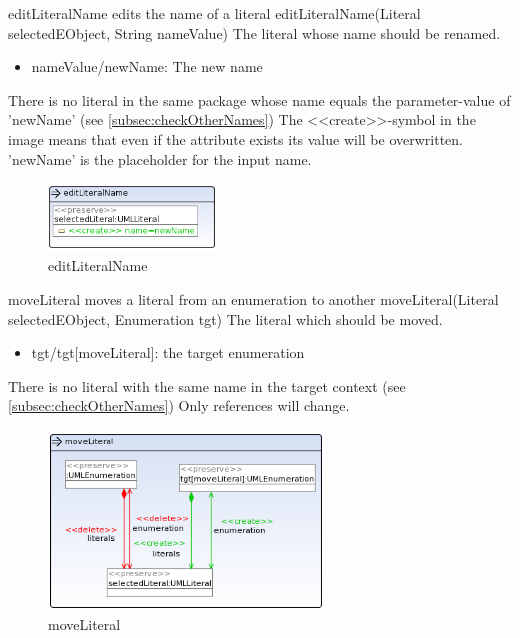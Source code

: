 \op
{editLiteralName}
{edits the name of a literal}
{editLiteralName(Literal selectedEObject, String nameValue)}
{The literal whose name should be renamed.}
{
\begin{itemize}
 \item nameValue/newName: The new name
\end{itemize}
}
{There is no literal in the same package whose name equals the parameter-value of
'newName' (see
\ref{subsec:checkOtherNames})}
{The \textless\textless create\textgreater\textgreater  -symbol in the image
means that even if the attribute exists its value will be overwritten.
'newName' is the placeholder for the input name.}
\begin{figure}[H]
  \centering
  \includegraphics[width=0.4\textwidth]{pics/editLiteralName.png}
  \caption{editLiteralName}
  \label{editLiteralName}
\end{figure}
\op
{moveLiteral}
{moves a literal from an enumeration to another}
{moveLiteral(Literal selectedEObject, Enumeration tgt)}
{The literal which should be moved.}
{
\begin{itemize}
 \item tgt/tgt[moveLiteral]: the target enumeration
\end{itemize}
}
{There is no literal with the same name in the target context (see
\ref{subsec:checkOtherNames})}
{Only references will change.}
\begin{figure}[H]
  \centering
  \includegraphics[width=0.65\textwidth]{pics/moveLiteral.png}
  \caption{moveLiteral}
  \label{moveLiteral}
\end{figure}
